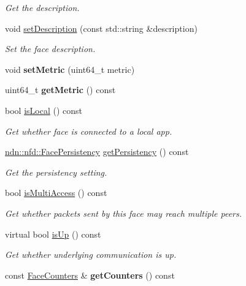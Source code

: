 \begin{DoxyCompactItemize}
\begin{DoxyCompactList}\small\item\em Get the description. \end{DoxyCompactList}\item 
void \hyperlink{classnfd_1_1Face_ab8fb68318523c8a1499cd7b83e7b8c7e}{set\+Description} (const std\+::string \&description)
\begin{DoxyCompactList}\small\item\em Set the face description. \end{DoxyCompactList}\item 
void {\bfseries set\+Metric} (uint64\+\_\+t metric)
\item 
uint64\+\_\+t {\bfseries get\+Metric} () const
\item 
bool \hyperlink{classnfd_1_1Face_a4c5a1c7822f13ad8650d804cf063b42a}{is\+Local} () const\hypertarget{classnfd_1_1Face_a4c5a1c7822f13ad8650d804cf063b42a}{}\label{classnfd_1_1Face_a4c5a1c7822f13ad8650d804cf063b42a}

\begin{DoxyCompactList}\small\item\em Get whether face is connected to a local app. \end{DoxyCompactList}\item 
\hyperlink{group__management_ga05df4b7c484a0fae25d3e65962511bac}{ndn\+::nfd\+::\+Face\+Persistency} \hyperlink{classnfd_1_1Face_ae6f9240dbcce29c856448a6da2fb78dc}{get\+Persistency} () const\hypertarget{classnfd_1_1Face_ae6f9240dbcce29c856448a6da2fb78dc}{}\label{classnfd_1_1Face_ae6f9240dbcce29c856448a6da2fb78dc}

\begin{DoxyCompactList}\small\item\em Get the persistency setting. \end{DoxyCompactList}\item 
bool \hyperlink{classnfd_1_1Face_a4c9f07c49193f0d97e6151d6bdef7d79}{is\+Multi\+Access} () const\hypertarget{classnfd_1_1Face_a4c9f07c49193f0d97e6151d6bdef7d79}{}\label{classnfd_1_1Face_a4c9f07c49193f0d97e6151d6bdef7d79}

\begin{DoxyCompactList}\small\item\em Get whether packets sent by this face may reach multiple peers. \end{DoxyCompactList}\item 
virtual bool \hyperlink{classnfd_1_1Face_a1b411a3984dc1c523bc092e00b373509}{is\+Up} () const
\begin{DoxyCompactList}\small\item\em Get whether underlying communication is up. \end{DoxyCompactList}\item 
const \hyperlink{classnfd_1_1FaceCounters}{Face\+Counters} \& {\bfseries get\+Counters} () const\hypertarget{classnfd_1_1Face_a1d87c7bf7e624419500424b6652df4fb}{}\label{classnfd_1_1Face_a1d87c7bf7e624419500424b6652df4fb}


\end{DoxyCompactItemize}
